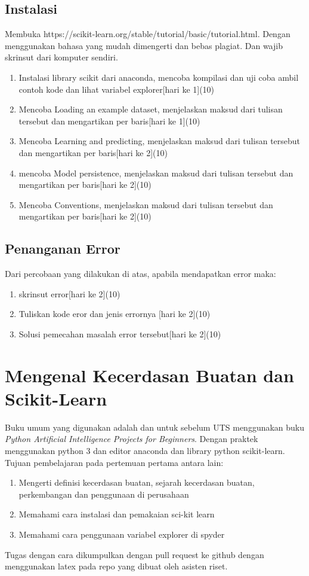 \section{Instalasi}
Membuka https://scikit-learn.org/stable/tutorial/basic/tutorial.html. Dengan menggunakan bahasa yang mudah dimengerti dan bebas plagiat.
Dan wajib skrinsut dari komputer sendiri.
\begin{enumerate}
\item
Instalasi library scikit dari anaconda, mencoba kompilasi dan uji coba ambil contoh kode dan lihat variabel explorer[hari ke 1](10)
\item
Mencoba Loading an example dataset, menjelaskan maksud dari tulisan tersebut dan mengartikan per baris[hari ke 1](10)
\item
Mencoba Learning and predicting, menjelaskan maksud dari tulisan tersebut dan mengartikan per baris[hari ke 2](10)
\item
mencoba Model persistence, menjelaskan maksud dari tulisan tersebut dan mengartikan per baris[hari ke 2](10)
\item
Mencoba Conventions, menjelaskan maksud dari tulisan tersebut dan mengartikan per baris[hari ke 2](10)
\end{enumerate}


\section{Penanganan Error}
Dari percobaan yang dilakukan di atas, apabila mendapatkan error maka:

\begin{enumerate}
	\item
	skrinsut error[hari ke 2](10)
	\item
Tuliskan kode eror dan jenis errornya [hari ke 2](10)
	\item
Solusi pemecahan masalah error tersebut[hari ke 2](10)

\end{enumerate}

\chapter{Mengenal Kecerdasan Buatan dan Scikit-Learn}
Buku umum yang digunakan adalah \cite{russell2016artificial} dan
untuk sebelum UTS menggunakan buku \textit{Python Artificial Intelligence Projects for Beginners}\cite{eckroth2018python}.
Dengan praktek menggunakan python 3 dan editor anaconda dan library python scikit-learn.
Tujuan pembelajaran pada pertemuan pertama antara lain:
\begin{enumerate}
\item
Mengerti definisi kecerdasan buatan, sejarah kecerdasan buatan, perkembangan dan penggunaan di perusahaan
\item
Memahami cara instalasi dan pemakaian sci-kit learn
\item
Memahami cara penggunaan variabel explorer di spyder
\end{enumerate}
Tugas dengan cara dikumpulkan dengan pull request ke github dengan menggunakan latex pada repo yang dibuat oleh asisten riset.

